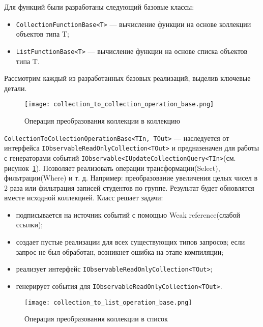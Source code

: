 Для функций были разработаны следующий базовые классы:

\begin{itemize}
  \item \lstinline[style=csharpinlinestyle]!CollectionFunctionBase<T>! --- вычисление функции на основе коллекции объектов типа T;
  \item \lstinline[style=csharpinlinestyle]!ListFunctionBase<T>! --- вычисление функции на основе списка объектов типа T.
\end{itemize}

Рассмотрим каждый из разработанных базовых реализаций, выделив ключевые детали.

\begin{figure}[ht]
\centering
  \texttt{[image: collection\_to\_collection\_operation\_base.png]}
  \caption{ Операция преобразования коллекции в коллекцию }
  \label{fig:collection_to_collection_operation_base}
\end{figure}

\lstinline[style=csharpinlinestyle]!CollectionToCollectionOperationBase<TIn, TOut>! --- наследуется от  интерфейса \lstinline[style=csharpinlinestyle]!IObservableReadOnlyCollection<TOut>!
и предназеначен для работы с генераторами событий \lstinline[style=csharpinlinestyle]!IObservable<IUpdateCollectionQuery<TIn>!(см. рисунок~\ref{fig:collection_to_collection_operation_base}).
Позволяет реализовать операции трансформации(Select), фильтрации(Where) и т. д. Например: преобразование увеличения целых чисел в 2 раза или фильтрация записей студентов по группе.
Результат будет обновлятся вместе исходной коллекцией. Класс решает задачи:

\begin{itemize}
  \item подписывается на источник событий с помощью Weak reference(слабой ссылки)\cite{weak_reference};
  \item создает пустые реализации для всех существующих типов запросов; если запрос не был обработан, возникнет ошибка на этапе компиляции;
  \item реализует интерфейс \lstinline[style=csharpinlinestyle]!IObservableReadOnlyCollection<TOut>!;
  \item генерирует события для \lstinline[style=csharpinlinestyle]!IObservableReadOnlyCollection<TOut>!.
\end{itemize}

\begin{figure}[ht]
\centering
  \texttt{[image: collection\_to\_list\_operation\_base.png]}
  \caption{ Операция преобразования коллекции в список }
  \label{fig:collection_to_list_operation_base}
\end{figure}

